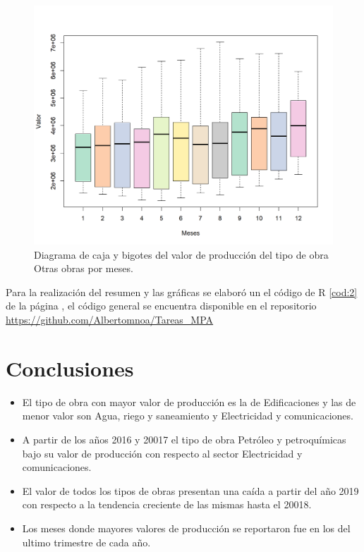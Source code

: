 \documentclass{article}
\begin{document}
\begin{center}
\begin{figure}[H]
\includegraphics[scale=0.8]{boxplot6.png}
\vspace{-0.6cm}
\caption{Diagrama de caja y bigotes del valor de producción del tipo de obra Otras obras por meses.}
\label{fig:fig6}
\end{figure}
\end{center}
\vspace{-1.4cm}
Para la realización del resumen y las gráficas se elaboró un el código de R \ref{cod:2} de la página \pageref{cod:2}, el código general se encuentra disponible en el repositorio \href{https://github.com/Albertomnoa/Tareas_MPA/Tarea1}{https://github.com/Albertomnoa/Tareas\_MPA} 

\begin{center}

\label{cod:2}
\end{center}

\section{Conclusiones}
 \begin{itemize}
     \item El tipo de obra con mayor valor de producción es la de Edificaciones y las de menor valor son Agua, riego y saneamiento y Electricidad y comunicaciones.
     \item A partir de los años 2016 y 20017 el tipo de obra Petróleo y petroquímicas bajo su valor de producción con respecto al sector Electricidad y comunicaciones. 
     \item El valor de todos los tipos de obras presentan una caída a partir del año 2019 con respecto a la tendencia creciente de las mismas hasta el 20018.
     \item Los meses donde mayores valores de producción se reportaron fue en los del ultimo trimestre de cada año.
 \end{itemize}

\newpage


\end{document}
